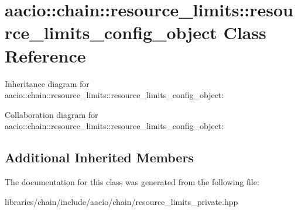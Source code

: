 \hypertarget{classaacio_1_1chain_1_1resource__limits_1_1resource__limits__config__object}{}\section{aacio\+:\+:chain\+:\+:resource\+\_\+limits\+:\+:resource\+\_\+limits\+\_\+config\+\_\+object Class Reference}
\label{classaacio_1_1chain_1_1resource__limits_1_1resource__limits__config__object}


Inheritance diagram for aacio\+:\+:chain\+:\+:resource\+\_\+limits\+:\+:resource\+\_\+limits\+\_\+config\+\_\+object\+:


Collaboration diagram for aacio\+:\+:chain\+:\+:resource\+\_\+limits\+:\+:resource\+\_\+limits\+\_\+config\+\_\+object\+:
\subsection*{Additional Inherited Members}


The documentation for this class was generated from the following file\+:\begin{DoxyCompactItemize}
\item 
libraries/chain/include/aacio/chain/resource\+\_\+limits\+\_\+private.\+hpp\end{DoxyCompactItemize}
